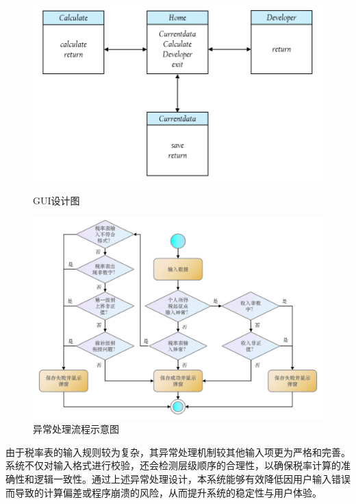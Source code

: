 \documentclass[a4paper, utf8]{ctexart}
\begin{document}
    \begin{figure}[htbp]
        \begin{minipage}{.4\linewidth}
            \centering
            \vspace{.02\textheight}
            \includegraphics[height=0.13\textheight]{figure/Windows.png}
            \vspace{.02\textheight}
            \caption{GUI设计图}
        \end{minipage}
        \begin{minipage}{.6\linewidth}
            \centering
            \includegraphics[height=0.17\textheight]{figure/Exception.png}
            \caption{异常处理流程示意图}
        \end{minipage}
    \end{figure}

    由于税率表的输入规则较为复杂，其异常处理机制较其他输入项更为严格和完善。系统不仅对输入格式进行校验，还会检测层级顺序的合理性，以确保税率计算的准确性和逻辑一致性。通过上述异常处理设计，本系统能够有效降低因用户输入错误而导致的计算偏差或程序崩溃的风险，从而提升系统的稳定性与用户体验。
\end{document}
